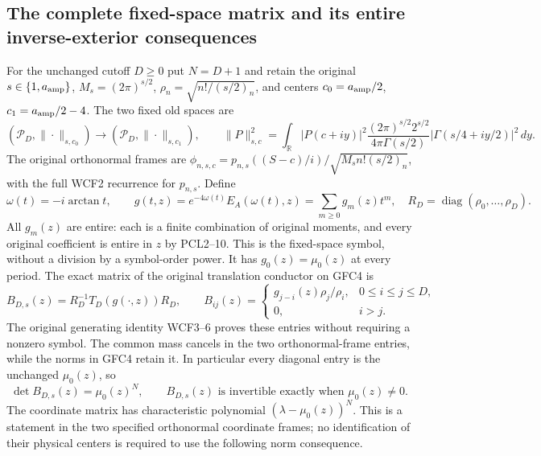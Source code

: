 \documentclass[11pt]{article}
\begin{document}
\subsection{The complete fixed-space matrix and its entire inverse-exterior consequences}
For the unchanged cutoff $D\ge0$ put $N=D+1$ and retain the original
$s\in\{1,a_{\rm amp}\}$, $M_s=(2\pi)^{s/2}$,
$\rho_n=\sqrt{n!/(s/2)_n}$, and centers
$c_0=a_{\rm amp}/2$, $c_1=a_{\rm amp}/2-4$.
The two fixed old spaces are
\[
 (\mathcal P_D,\|\cdot\|_{s,c_0})
       \longrightarrow(\mathcal P_D,\|\cdot\|_{s,c_1}),\qquad
 \|P\|_{s,c}^2=\int_{\mathbb R}|P(c+iy)|^2
 \frac{(2\pi)^{s/2}2^{s/2}}{4\pi\Gamma(s/2)}
       |\Gamma(s/4+iy/2)|^2\,dy.
 \tag{GFC4}
\]
The original orthonormal frames are
$\phi_{n,s,c}=p_{n,s}((S-c)/i)/\sqrt{M_sn!(s/2)_n}$,
with the full WCF2 recurrence for $p_{n,s}$.
Define
\[
 \omega(t)=-i\arctan t,\qquad
 g(t,z)=e^{-4\omega(t)}E_A(\omega(t),z)
       =\sum_{m\ge0}g_m(z)t^m,
 \quad
 R_D=\operatorname{diag}(\rho_0,\ldots,\rho_D).
 \tag{GFC5}
\]
All $g_m(z)$ are entire: each is a finite combination of original
moments, and every original coefficient is entire in $z$ by PCL2--10.
This is the fixed-space symbol, without a division by a symbol-order
power. It has $g_0(z)=\mu_0(z)$ at every period.
The exact matrix of the original translation conductor on GFC4 is
\[
 B_{D,s}(z)=R_D^{-1}T_D(g(\cdot,z))R_D,
 \qquad
 B_{ij}(z)=
 \begin{cases}
 g_{j-i}(z)\rho_j/\rho_i,&0\le i\le j\le D,\\
 0,&i>j.
 \end{cases}
 \tag{GFC6}
\]
The original generating identity WCF3--6 proves these entries without
requiring a nonzero symbol. The common mass cancels in the two
orthonormal-frame entries, while the norms in GFC4 retain it.
In particular every diagonal entry is the unchanged $\mu_0(z)$, so
\[
 \det B_{D,s}(z)=\mu_0(z)^N,\qquad
 B_{D,s}(z)\text{ is invertible exactly when }\mu_0(z)\ne0.
 \tag{GFC7}
\]
The coordinate matrix has characteristic polynomial
$(\lambda-\mu_0(z))^N$. This is a statement in the two specified
orthonormal coordinate frames; no identification of their physical
centers is required to use the following norm consequence.
\end{document}
